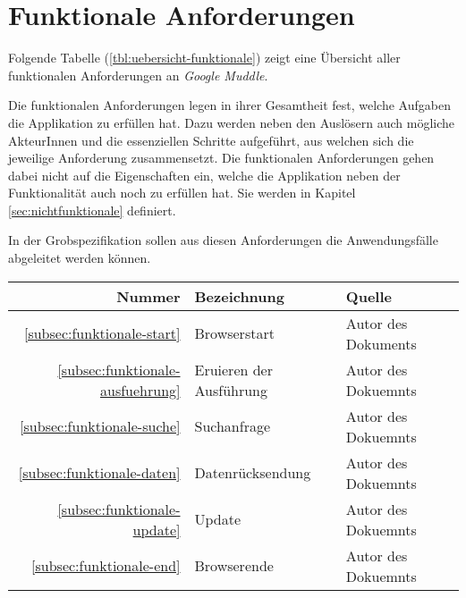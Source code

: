 \section{Funktionale Anforderungen}
\label{sec:funktionale}

Folgende Tabelle (\ref{tbl:uebersicht-funktionale}) zeigt eine Übersicht aller
funktionalen Anforderungen an \textit{Google Muddle}.

Die funktionalen Anforderungen legen in ihrer Gesamtheit fest, welche Aufgaben
die Applikation zu erfüllen hat. Dazu werden neben den Auslösern auch
mögliche AkteurInnen und die essenziellen Schritte aufgeführt, aus welchen sich
die jeweilige Anforderung zusammensetzt. Die funktionalen Anforderungen gehen
dabei nicht auf die Eigenschaften ein, welche die Applikation neben der
Funktionalität auch noch zu erfüllen hat. Sie werden in Kapitel
\ref{sec:nichtfunktionale} definiert.

In der Grobspezifikation sollen aus diesen Anforderungen die Anwendungsfälle
abgeleitet werden können.
\\[\intextsep]
\begin{minipage}{\linewidth}
	\centering
	\begin{tabular}{rll}
		\hline
		Nummer                                & Bezeichnung               
		                                      & Quelle               \\
		\hline
		\ref{subsec:funktionale-start}        & Browserstart              
		                                      & Autor des Dokuments  \\
		\ref{subsec:funktionale-ausfuehrung}  & Eruieren der Ausführung   
		                                      & Autor des Dokuemnts  \\
		\ref{subsec:funktionale-suche}        & Suchanfrage               
		                                      & Autor des Dokuemnts  \\
		\ref{subsec:funktionale-daten}        & Datenrücksendung          
		                                      & Autor des Dokuemnts  \\
		\ref{subsec:funktionale-update}       & Update                    
		                                      & Autor des Dokuemnts  \\
		\ref{subsec:funktionale-end}          & Browserende               
		                                      & Autor des Dokuemnts  \\
		\hline
	\end{tabular}
	\label{tbl:uebersicht-funktionale}
\end{minipage}

\newpage

\newpage

\newpage

\newpage



